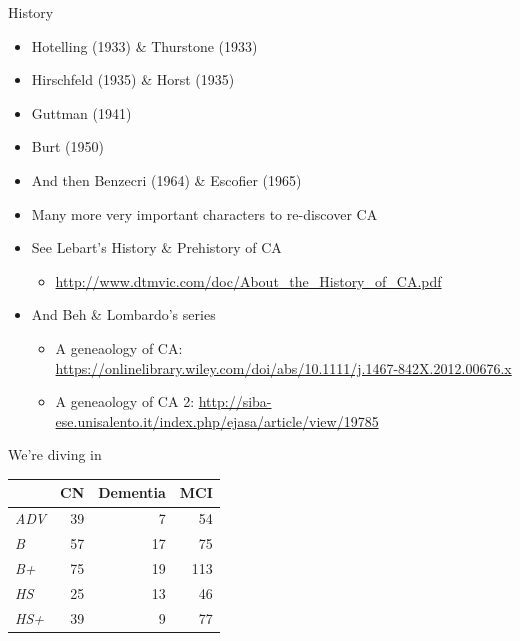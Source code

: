 \documentclass[
  ignorenonframetext,
]{beamer}
\providecommand{\tightlist}{%
  \setlength{\itemsep}{0pt}\setlength{\parskip}{0pt}}
\begin{document}
\begin{frame}{History}
\protect\hypertarget{history}{}

\begin{itemize}[<+->]
\tightlist
\item
  Hotelling (1933) \& Thurstone (1933)
\item
  Hirschfeld (1935) \& Horst (1935)
\item
  Guttman (1941)
\item
  Burt (1950)
\item
  And then Benzecri (1964) \& Escofier (1965)
\item
  Many more very important characters to re-discover CA
\end{itemize}

\end{frame}

\begin{frame}

\begin{itemize}[<+->]
\tightlist
\item
  See Lebart's History \& Prehistory of CA

  \begin{itemize}[<+->]
  \tightlist
  \item
    \url{http://www.dtmvic.com/doc/About_the_History_of_CA.pdf}
  \end{itemize}
\item
  And Beh \& Lombardo's series

  \begin{itemize}[<+->]
  \tightlist
  \item
    A geneaology of CA:
    \url{https://onlinelibrary.wiley.com/doi/abs/10.1111/j.1467-842X.2012.00676.x}
  \item
    A geneaology of CA 2:
    \url{http://siba-ese.unisalento.it/index.php/ejasa/article/view/19785}
  \end{itemize}
\end{itemize}

\end{frame}

\begin{frame}{We're diving in}
\protect\hypertarget{were-diving-in}{}

\end{frame}

\begin{frame}

\begin{table}[H]
\centering
\begin{tabular}{>{\em}lrrr}
\toprule
  & CN & Dementia & MCI\\
\midrule
ADV & 39 & 7 & 54\\
B & 57 & 17 & 75\\
B+ & 75 & 19 & 113\\
HS & 25 & 13 & 46\\
HS+ & 39 & 9 & 77\\
\bottomrule
\end{tabular}
\end{table}

\end{frame}
\end{document}
